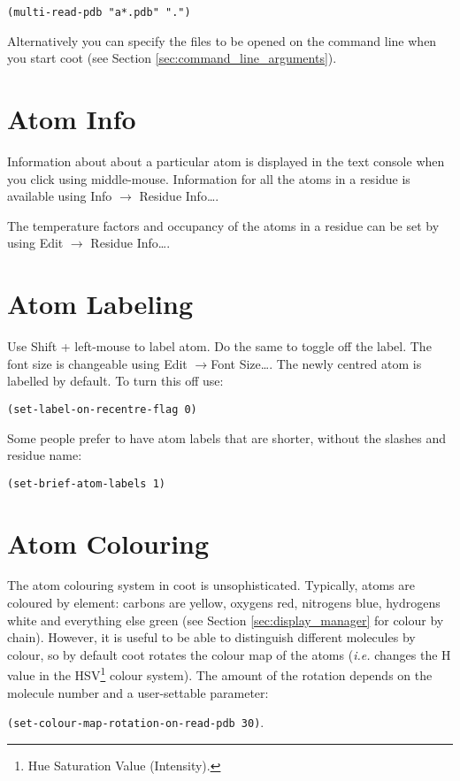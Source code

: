 \documentclass{book}
\begin{document}
\texttt{(multi-read-pdb "a*.pdb" ".")}

Alternatively you can specify the files to be opened on the command
line when you start coot (see Section
\ref{sec:command_line_arguments}).

\section{Atom Info}
 Information about about a
particular atom is displayed in the text console when you click using
middle-mouse.  Information for all the atoms in a residue is available
using \textsf{Info $\rightarrow$ Residue Info\ldots}.

The temperature factors
and occupancy of the atoms in a residue can be set by using
\textsf{Edit $\rightarrow$ Residue Info\ldots}.

\section{Atom Labeling}
\label{sec:atom}
Use Shift + left-mouse to label atom.  Do the same to toggle off the
label.  The font size is changeable using \textsf{Edit $\rightarrow
  $Font Size\ldots}.  The newly centred atom is labelled by default.
To turn this off use:

\texttt{(set-label-on-recentre-flag 0)}

Some people prefer to have atom labels that
are shorter, without the slashes and residue name:

\texttt{(set-brief-atom-labels 1)}

\section{Atom Colouring}
The atom colouring  
system in coot is unsophisticated. Typically, atoms are coloured by
element: carbons are yellow, oxygens red, nitrogens blue, hydrogens
white and everything else green (see Section \ref{sec:display_manager}
for colour by chain).  However, it is useful to be able to distinguish
different molecules by colour, so by default coot rotates the colour
map of the atoms (\emph{i.e.} changes the H value in the
HSV\footnote{Hue Saturation Value (Intensity).}  colour system).  The
amount of the rotation depends on the molecule number and a
user-settable parameter:
\begin{trivlist}
\item \texttt{(set-colour-map-rotation-on-read-pdb 30)}.
\end{trivlist}
\end{document}
